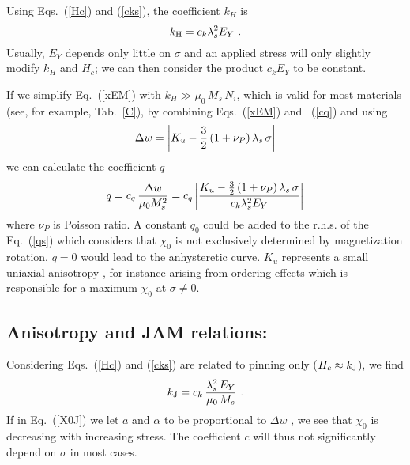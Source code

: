 \documentclass[../main.tex]{subfiles}
\begin{document}
Using Eqs.~(\ref{Hc}) and (\ref{cks}), the coefficient $k_H$ is
\begin{equation}
  k_{\rm H} = c_{k} \lambda_s^2 E_Y \ .
  \label{ks}
\end{equation}
Usually, $E_Y$ depends only little on $\sigma$ and an applied stress will only
slightly modify $k_H$ and $H_c$; we can then consider the product $c_{k}E_Y$ to be
constant.

If we simplify Eq.~(\ref{xEM}) with $k_H\gg\mu_0\,M_s\,N_i$, which is valid for
most materials (see, for example, Tab.~\ref{C}), by combining
Eqs.~(\ref{xEM}) and ~(\ref{cq}) and using
\begin{equation}
	\Delta w = \left|{K_u-{3\over 2}\,(1+\nu_P)\,\lambda_s\,\sigma}\right|
\end{equation}
we can calculate the coefficient $q$
\begin{equation}
  q = c_q\,{\Delta w \over \mu_0 M_s^2} = c_q \left|{K_u-{3\over 2}\,(1+\nu_P)\,\lambda_s\,\sigma
    \over c_{k} \lambda_s^2 E_Y}\right|
  \label{qs}
\end{equation}
where $\nu_P$ is Poisson ratio. A constant $q_0$ could be added to the r.h.s.
of the Eq.~(\ref{qs}) which considers that $\chi_0$ is not exclusively determined by
magnetization rotation. $q=0$ would lead to the anhysteretic curve. $K_u$
represents a small uniaxial anisotropy
\cite{Appino},
for instance arising from ordering effects \cite{Fujimori} which is responsible
for a maximum $\chi_0$ at $\sigma\ne 0$.


\subsection{Anisotropy and JAM relations:}

Considering Eqs.~(\ref{Hc}) and (\ref{cks}) are related to pinning only
($H_c\approx k_{\rm J}$), we find
\begin{equation}
  k_{\rm J} = c_k\,{\lambda_s^2\,E_Y\over \mu_0\,M_s} \ .
\end{equation}
If in Eq.~(\ref{X0J}) we let $a$ and $\alpha$ to be proportional to $\Delta w$ \cite{JMMM},
we see that $\chi_0$ is decreasing with increasing stress. The coefficient $c$ will thus not significantly depend on $\sigma$ in most cases.

\cleardoublepage
\end{document}
